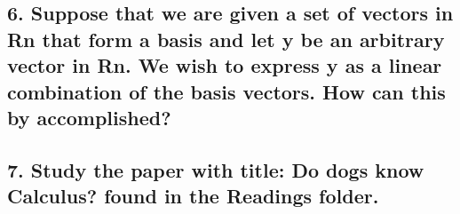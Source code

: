 \documentclass[12pt]{article}
\begin{document}
\vspace{2in}


\pagebreak

\subsection*{6. Suppose that we are given a set of vectors in Rn that form a basis and let y be an
arbitrary vector in Rn. We wish to express y as a linear combination of the basis vectors. How
can this by accomplished?}

\vspace{2in}


\pagebreak

\subsection*{7. Study the paper with title: Do dogs know Calculus? found in the Readings folder.}

\vspace{2in}
\end{document}
